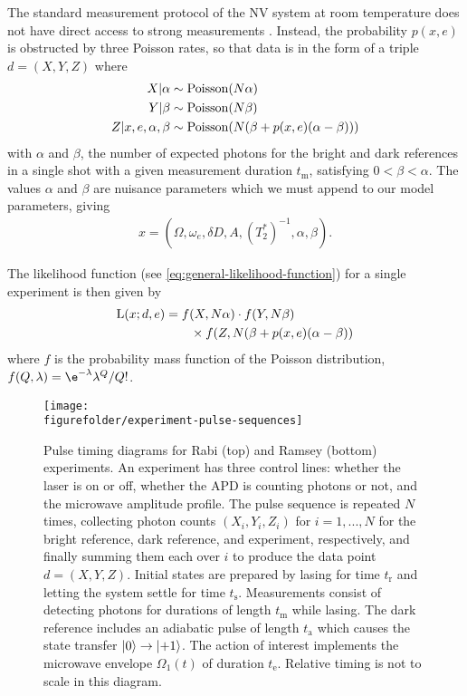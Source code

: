 \documentclass[aps,nofootinbib,twocolumn,superscriptaddress]{revtex4}
\newcommand{\figurefolder}{../fig}
\newcommand{\mps}{x}
\newcommand{\eps}{e}
\newcommand{\data}{d}
\newcommand{\te}{t_\text{e}}
\newcommand{\tm}{t_\text{m}}
\begin{document}
The standard measurement protocol of the NV system at room
temperature does not have direct access to strong measurements 
\cite{hincks_statistical_2018}.
Instead, the probability $p(\mps,\eps)$ is obstructed by three Poisson
rates, so that data is in the form of a triple $\data=(X,Y,Z)$
where
\begin{subequations}
\begin{align}
    X|\alpha
        & \sim\poissondist(N\alpha) \\
    Y|\beta
        & \sim\poissondist(N\beta) \\
    Z|\mps,\eps,\alpha,\beta
        & \sim\poissondist(N(\beta+p(\mps,\eps)(\alpha-\beta)))
\end{align}
\label{eq:nv-measurement}
\end{subequations}
with $\alpha$ and $\beta$,
the number of expected
photons for the bright and dark references in a single shot with a 
given measurement duration $\tm$,
 satisfying $0<\beta<\alpha$.
The values $\alpha$ and $\beta$ are nuisance parameters which we
must append to our model parameters, giving
\begin{align}
    \mps=(\Omega,\omega_e,\delta D,A,(T_2^*)^{-1},\alpha,\beta).
    \label{eq:nv-model-parameters}
\end{align}

The likelihood function (see \autoref{eq:general-likelihood-function}) 
for a single experiment is then given by
\begin{align}
    \Lhood(\mps;\data,\eps) 
        &= f(X,N\alpha)
            \cdot f(Y, N\beta) \nonumber \\
            &\quad\quad\times f(Z, N(\beta+p(\mps,\eps)(\alpha-\beta))
    \label{eq:likelihood-function}
\end{align}
where $f$ is the probability mass function of the Poisson distribution,
$f(Q,\lambda) = \e^{-\lambda}\lambda^Q/Q!$.


\begin{figure}[t]
    \texttt{[image: \\figurefolder/experiment-pulse-sequences]}
    \caption{Pulse timing diagrams for Rabi (top) and Ramsey 
        (bottom) experiments. An experiment has three control lines:
        whether the laser is on or off, whether the APD is counting 
        photons or not, and the microwave amplitude profile.
        The pulse sequence is repeated $N$ times, collecting
        photon counts $(X_i,Y_i,Z_i)$ for $i=1,...,N$ for the bright reference,
        dark reference, and experiment, respectively, and finally summing them
        each over $i$ to produce the data point $\data=(X,Y,Z)$.
        Initial states are prepared by lasing for time $t_\text{r}$
        and letting the system settle for time $t_\text{s}$.
        Measurements consist of detecting photons for 
        durations of length $\tm$ while lasing.
        The dark reference includes an adiabatic pulse of length 
        $t_\text{a}$ which causes the state 
        transfer $\ket{0}\rightarrow\ket{+1}$.
        The action of interest implements the microwave envelope 
        $\Omega_1(t)$ of duration $\te$.
        Relative timing is not to scale in this diagram.
        }
    \label{fig:experiment-pulse-sequences}
\end{figure}
\end{document}

